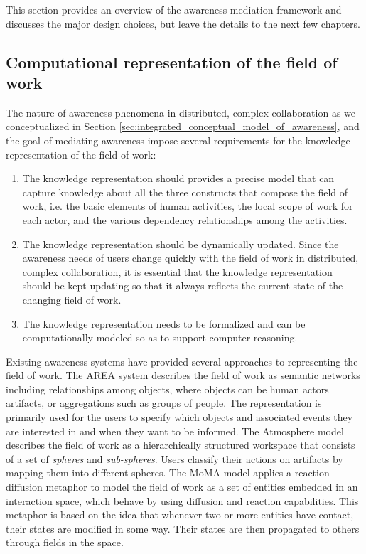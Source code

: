 This section provides an overview of the awareness mediation framework and discusses the major design choices, but leave the details to the next few chapters.

\subsection{Computational representation of the field of work} %
\label{sub:computational_representation_of_the_field_of_work}
The nature of awareness phenomena in distributed, complex collaboration as we conceptualized in Section \ref{sec:integrated_conceptual_model_of_awareness}, and the goal of mediating awareness impose several requirements for the knowledge representation of the field of work:

\begin{enumerate}
   \item The knowledge representation should provides a precise model that can capture knowledge about all the three constructs that compose the field of work, i.e. the basic elements of human activities, the local scope of work for each actor, and the various dependency relationships among the activities. 
   \item The knowledge representation should be dynamically updated. Since the awareness needs of users change quickly with the field of work in distributed, complex collaboration, it is essential that the knowledge representation should be kept updating so that it always reflects the current state of the changing field of work.
   \item The knowledge representation needs to be formalized and can be computationally modeled so as to support computer reasoning.
\end{enumerate}

Existing awareness systems have provided several approaches to representing the field of work. The AREA system \cite{fuchs1999a} describes the field of work as semantic networks including relationships among objects, where objects can be human actors artifacts, or aggregations such as groups of people. The representation is primarily used for the users to specify which objects and associated events they are interested in and when they want to be informed. The Atmosphere model \cite{Rittenbruch2002} describes the field of work as a hierarchically structured workspace that consists of a set of \emph{spheres} and \emph{sub-spheres}. Users classify their actions on artifacts by mapping them into different spheres. The MoMA model \cite{simone2002a} applies a reaction-diffusion metaphor to model the field of work as a set of entities embedded in an interaction space, which behave by using diffusion and reaction capabilities. This metaphor is based on the idea that whenever two or more entities have contact, their states are modified in some way. Their states are then propagated to others through fields in the space.  

